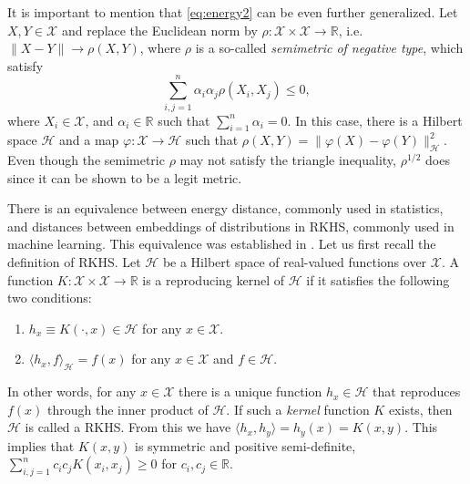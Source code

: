 \documentclass{article}
\newcommand\kk{K}
\newcommand\kkk{h}
\newcommand\HH{\mathcal{H}}
\begin{document}
It is important to 
mention that \eqref{eq:energy2} can be even further generalized.
Let $X, Y \in \mathcal{X}$ and replace the Euclidean norm by
$\rho: \mathcal{X}\times\mathcal{X} \to \mathbb{R}$, i.e.
$\| X - Y\| \to \rho(X,Y)$, where $\rho$ is a so-called \emph{semimetric
of negative type},
which satisfy 
\begin{equation}
\label{eq:negative_type}
\sum_{i,j=1}^n \alpha_i \alpha_j \rho(X_i, X_j) \le 0,
\end{equation}
where $X_i \in \mathcal{X}$, and $\alpha_i \in \mathbb{R}$ such that
$\sum_{i=1}^n \alpha_i = 0$.
In this case, there is a Hilbert space $\mathcal{H}$ and
a map $\varphi: \mathcal{X} \to
\mathcal{H}$ such that
$\rho(X, Y) = \| \varphi(X) - \varphi(Y) \|_{\mathcal{H}}^2$. 
Even though the semimetric 
$\rho$ may not satisfy the triangle inequality, 
$\rho^{1/2}$ does since it can be shown to be a legit metric. 

There is an equivalence between energy distance, 
commonly used in statistics,
and distances between embeddings of distributions in 
RKHS, commonly used in machine learning. 
This equivalence was established
in \cite{Sejdinovic2013}. Let us first recall the definition of
RKHS. Let $\HH$ be a Hilbert space of real-valued functions
over $\mathcal{X}$. A function 
$\kk : \mathcal{X} \times \mathcal{X} \to 
\mathbb{R}$ is a reproducing kernel of $\HH$ if it satisfies
the following two conditions:
\begin{enumerate}
\item $\kkk_x \equiv \kk(\cdot, x) \in \HH$ 
for any $x \in \mathcal{X}$.
\item $\langle \kkk_x, f \rangle_{\HH} = f(x)$ for
any $x\in\mathcal{X}$ and $f\in \HH$.
\end{enumerate}
In other words, for any $x \in \mathcal{X}$ there is a unique function
$\kkk_x \in \HH$ that reproduces $f(x)$ through the inner product
of $\HH$.
If such a \emph{kernel} 
function $\kk$ exists, then $\HH$ is called a RKHS.
From this we have $\langle \kkk_x, \kkk_y \rangle = \kkk_y(x) = \kk(x,y)$. 
This implies
that $\kk(x,y)$ is symmetric and positive semi-definite, 
$\sum_{i,j=1}^n c_i c_j
\kk(x_i,x_j) \ge 0$ for $c_i,c_j \in \mathbb{R}$.
\end{document}
